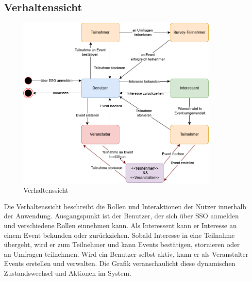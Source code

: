 \documentclass[a4paper,12pt]{article}
\begin{document}
\subsection{Verhaltenssicht}
\begin{figure}[H]
  \centering
  \includegraphics[width=0.9\textwidth]{Abbildungen/verhaltenssicht.png}
  \caption{Verhaltenssicht}
  \label{fig:verhaltenssicht}
\end{figure}
Die Verhaltenssicht beschreibt die Rollen und Interaktionen der Nutzer innerhalb der Anwendung. Ausgangspunkt ist der Benutzer, der sich über SSO anmelden und verschiedene Rollen einnehmen kann. Als Interessent kann er Interesse an einem Event bekunden oder zurückziehen. Sobald Interesse in eine Teilnahme übergeht, wird er zum Teilnehmer und kann Events bestätigen, stornieren oder an Umfragen teilnehmen. Wird ein Benutzer selbst aktiv, kann er als Veranstalter Events erstellen und verwalten. Die Grafik veranschaulicht diese dynamischen Zustandswechsel und Aktionen im System.

\end{document}
